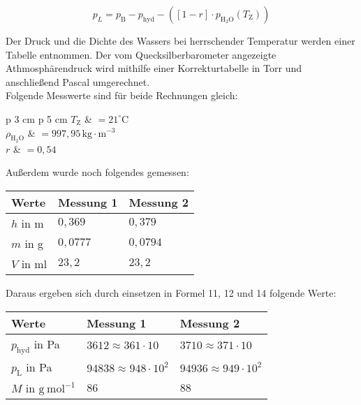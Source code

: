 \documentclass[12pt,a4paper,titlepage,headinclude,bibtotoc]{scrartcl}
\begin{document}
\begin{equation}
p_L = p_\mathrm{B} - p_\mathrm{hyd} - ([1-r] \cdot p_\mathrm{H_2O}(T_\mathrm{Z}))
\end{equation}

Der Druck und die Dichte des Wassers bei herrschender Temperatur werden einer Tabelle entnommen. Der vom Quecksilberbarometer angezeigte Athmosphärendruck wird mithilfe einer Korrekturtabelle in Torr und anschließend Pascal umgerechnet.\\
Folgende Messwerte sind für beide Rechnungen gleich:\\

\begin{table} [h]
\begin{tabular} {p {3 cm} p {5 cm}}
$T_\mathrm{Z} $ & $=21^\circ\text{C}$\\
	$ \rho_\mathrm{H_2O} $ & $=997,95\, \mathrm{kg} \cdot 				\mathrm{m^{-3}}$\protect\footnotemark\\
	$ r $ & $=0,54$\\
\end{tabular}
\end{table}


Außerdem wurde noch folgendes gemessen:\\

\begin{table} [h]
\centering
\begin{tabular}{|p{4 cm}||p{4 cm}|p{4 cm}|}
        \hline
		Werte & Messung 1 & Messung 2\\
         \hline 
        $ h$ in m & $0,369$  & $0,379$ \\
        \hline
        $ m$ in g & $0,0777$  & $0,0794$ \\
        \hline
        $ V $ in ml & $23,2$ & $23,2$ \\
        \hline     
\end{tabular}
\end{table}

Daraus ergeben sich durch einsetzen in Formel 11, 12 und 14 folgende Werte:


\begin{table} [h]
\centering
\begin{tabular}{|p{4 cm}||p{4 cm}|p{4 cm}|}
        \hline
		Werte & Messung 1 & Messung 2\\
         \hline 
        $ p_\mathrm{hyd}$ in Pa & $3612 \approx 361 \cdot 10$  & $3710 \approx 371 \cdot 10$ \\
        \hline
        $ p_\mathrm{L}   $ in Pa & $94838 \approx 948 \cdot 10^2$  & $94936 \approx 949 \cdot 10^2$ \\
        \hline
        $ M $ in $\mathrm{g{~}mol^{-1}}$ & $86$ & $88$ \\
        \hline     
\end{tabular}
\end{table}
\end{document}
